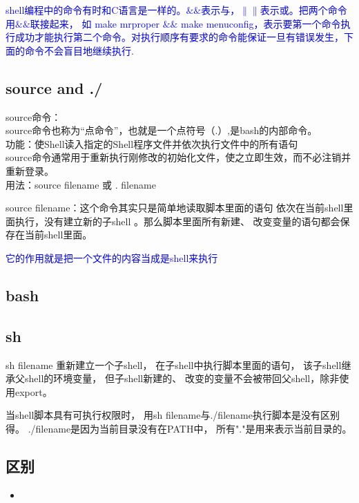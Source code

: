 \textcolor{blue}{shell编程中的命令有时和C语言是一样的。$\&\&$表示与，$\|\|$表示或。把两个命令用$\&\&$联接起来，
如 make mrproper $\&\&$ make menuconfig，表示要第一个命令执行成功才能执行第二个命令。对执行顺序有要求的命令能保证一旦有错误发生，下面的命令不会盲目地继续执行}.
\subsection{source and ./}
    source命令：\\
    source命令也称为“点命令”，也就是一个点符号（.）,是bash的内部命令。\\
    功能：使Shell读入指定的Shell程序文件并依次执行文件中的所有语句\\
    source命令通常用于重新执行刚修改的初始化文件，使之立即生效，而不必注销并重新登录。\\
    用法：source filename 或 . filename
\par source filename：这个命令其实只是简单地读取脚本里面的语句
依次在当前shell里面执行，没有建立新的子shell
。那么脚本里面所有新建、
改变变量的语句都会保存在当前shell里面。
\par \textcolor{blue}{它的作用就是把一个文件的内容当成是shell来执行}
\subsection{bash}
\subsection{sh}

sh filename 重新建立一个子shell，
在子shell中执行脚本里面的语句，
该子shell继承父shell的环境变量，
但子shell新建的、
改变的变量不会被带回父shell，除非使用export。
\par
当shell脚本具有可执行权限时，
用sh filename与./filename执行脚本是没有区别得。
./filename是因为当前目录没有在PATH中，
所有"."是用来表示当前目录的。
\subsection{区别}
\begin{itemize}
    \item 
\end{itemize}